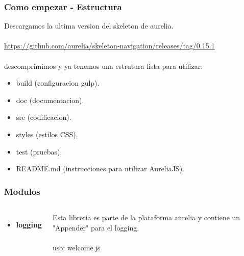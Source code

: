 \documentclass{beamer}
\begin{document}

\begin{frame}
\frametitle{Como empezar - Estructura}
Descargamos la ultima version del skeleton de aurelia.
\\~\\
{\color{blue}\url{https://github.com/aurelia/skeleton-navigation/releases/tag/0.15.1}}
\\~\\
descomprimimos y ya tenemos una estrutura lista para utilizar:
\begin{itemize}
\item build (configuracion gulp).
\item doc (documentacion).
\item src (codificacion).
\item styles (estilos CSS).
\item test (pruebas).
\item README.md (instrucciones para utilizar AureliaJS).
\end{itemize}
\end{frame}





\begin{frame}
\frametitle{Modulos}
\begin{columns}[c] %

\begin{itemize}
\item \textbf{logging}
\end{itemize}

Esta libreria es parte de la plataforma aurelia y contiene un "Appender" para el logging.
\\~\\
uso:
welcome.js
\end{columns}
\end{frame}
\end{document}
